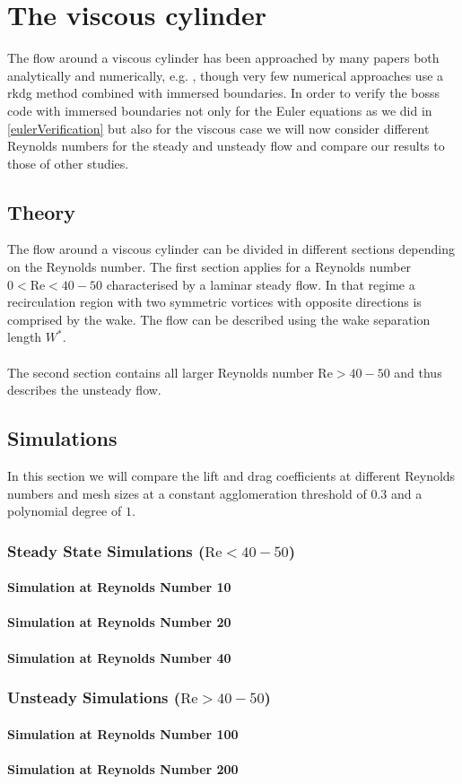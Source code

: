 \chapter{The viscous cylinder}
The flow around a viscous cylinder has been approached by many papers both analytically  and numerically, e.g. , though very few numerical approaches use a \gls{rkdg} method combined with immersed boundaries. In order to verify the \gls{bosss} code with immersed boundaries not only for the Euler equations as we did in \ref{eulerVerification} but also for the viscous case we will now consider different Reynolds numbers for the steady and unsteady flow and compare our results to those of other studies.

\section{Theory}
	The flow around a viscous cylinder can be divided in different sections depending on the Reynolds number. The first section applies for a Reynolds number $0 < \text{Re} < 40-50$ characterised by a laminar steady flow. In that regime a recirculation region with two symmetric vortices with opposite directions is comprised by the wake. The flow can be described using the wake separation length $W^*$.\\\\
	 
	The second section contains all larger Reynolds number $\text{Re}> 40-50$ and thus describes the unsteady flow. 

\section{Simulations}
	In this section we will compare the lift and drag coefficients at different Reynolds numbers and mesh sizes at a constant agglomeration threshold of $0.3$ and a polynomial degree of $1$.
	\subsection{Steady State Simulations ($\text{Re} < 40-50$)}
	\subsubsection{Simulation at Reynolds Number 10}
	\subsubsection{Simulation at Reynolds Number 20}
	\subsubsection{Simulation at Reynolds Number 40}
	\subsection{Unsteady Simulations ($\text{Re}> 40-50$)}
	\subsubsection{Simulation at Reynolds Number 100}
	\subsubsection{Simulation at Reynolds Number 200}